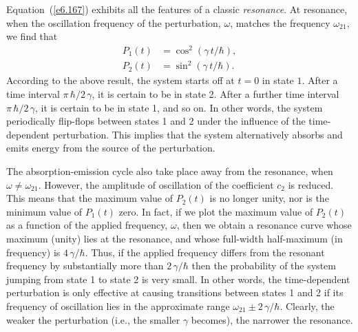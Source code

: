 Equation~(\ref{e6.167}) exhibits all the features of a classic {\em resonance}.
At resonance, when the oscillation frequency of 
the perturbation, $\omega$, matches the frequency $\omega_{21}$, we find
that
\begin{align}
P_1(t) &=\cos^2 (\gamma \,t / \hbar),\\[0.5ex]
P_2(t) &= \sin^2 (\gamma \,t/\hbar ).
\end{align}
According to the above result,
 the system starts off at $t=0$ in state $1$. After a time
interval $\pi \,\hbar/2\,\gamma$, it is certain to be in state 2. After a
further time interval $\pi\, \hbar/2\,\gamma$, it is certain to be in
state 1, and so on. In other words, the system periodically flip-flops between states
1 and 2 under the influence of the time-dependent perturbation. This
implies that the system  alternatively absorbs and emits  energy from
the source of the perturbation. 

The absorption-emission cycle also take place away from the resonance,
when $\omega\neq \omega_{21}$. However, the amplitude of oscillation of
the coefficient $c_2$ is reduced. This means that the maximum value
of $P_2(t)$ is no longer unity, nor is the minimum value of $P_1(t)$
zero. In fact, if we plot the maximum value of $P_2(t)$ as a function
of the applied frequency, $\omega$, then we obtain a resonance curve
whose maximum (unity) lies at the resonance, and whose full-width
half-maximum (in frequency) is $4\,\gamma/\hbar$. Thus, if the
applied frequency differs from the resonant frequency by  substantially
more than $2\,\gamma/\hbar$ then the probability of the system jumping from
state 1 to state 2 is very small. In other words, the time-dependent
perturbation is only effective at causing transitions between states
1 and 2 if its frequency of oscillation lies in the approximate range
$\omega_{21} \pm 2\,\gamma/\hbar$. Clearly, the weaker the perturbation
({\rm i.e.}, the smaller $\gamma$ becomes), the narrower the resonance.

